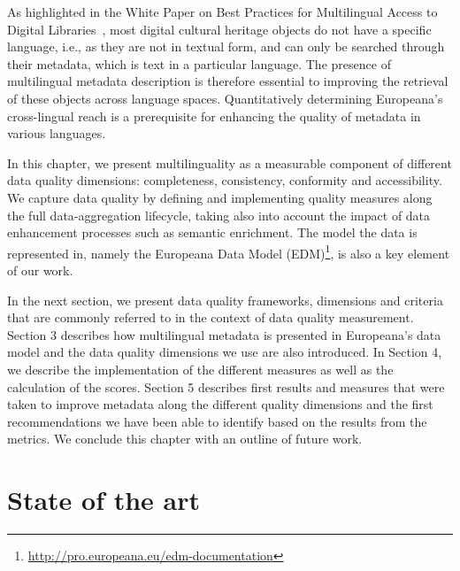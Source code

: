 As highlighted in the White Paper on Best Practices for Multilingual Access to Digital Libraries~\cite{stiller2016}, most digital cultural heritage objects do not have a specific language, i.e., as they are not in textual form, and can only be searched through their metadata, which is text in a particular language. The presence of multilingual metadata description is therefore essential to improving the retrieval of these objects across language spaces. Quantitatively determining Europeana's cross-lingual reach is a prerequisite for enhancing the quality of metadata in various languages.


In this chapter, we present multilinguality as a 
measurable component of different data quality dimensions: completeness, consistency, conformity and accessibility. We capture data quality by defining and implementing quality measures along the full data-aggregation lifecycle, taking also into account the impact of data enhancement processes such as semantic enrichment. The model the data is represented in, namely the Europeana Data Model (EDM)\footnote{\url{http://pro.europeana.eu/edm-documentation}}, is also a key element of our work. 

In the next section, we present data quality frameworks, dimensions and criteria that are commonly referred to in the context of data quality measurement. Section 3 describes how multilingual metadata is presented in Europeana's data model and the data quality dimensions we use are also introduced. In Section 4, we describe the implementation of the different measures as well as the calculation of the scores. Section 5 describes first results and measures that were taken to improve metadata along the different quality dimensions and the first recommendations we have been able to identify based on the results from the metrics. We conclude this chapter with an outline of future work. 

\section{State of the art}

